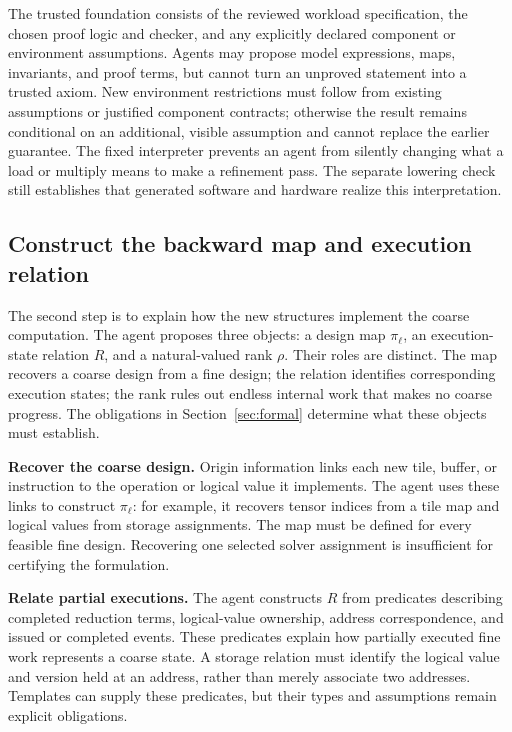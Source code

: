 \documentclass[11pt]{article}
\begin{document}
The trusted foundation consists of the reviewed workload specification, the chosen proof logic and checker, and any explicitly declared component or environment assumptions. Agents may propose model expressions, maps, invariants, and proof terms, but cannot turn an unproved statement into a trusted axiom. New environment restrictions must follow from existing assumptions or justified component contracts; otherwise the result remains conditional on an additional, visible assumption and cannot replace the earlier guarantee. The fixed interpreter prevents an agent from silently changing what a load or multiply means to make a refinement pass. The separate lowering check still establishes that generated software and hardware realize this interpretation.

\subsection{Construct the backward map and execution relation}\label{sec:certificate-construction}
The second step is to explain how the new structures implement the coarse computation. The agent proposes three objects: a design map $\pi_\ell$, an execution-state relation $R$, and a natural-valued rank $\rho$. Their roles are distinct. The map recovers a coarse design from a fine design; the relation identifies corresponding execution states; the rank rules out endless internal work that makes no coarse progress. The obligations in Section~\ref{sec:formal} determine what these objects must establish.

\textbf{Recover the coarse design.} Origin information links each new tile, buffer, or instruction to the operation or logical value it implements. The agent uses these links to construct $\pi_\ell$: for example, it recovers tensor indices from a tile map and logical values from storage assignments. The map must be defined for every feasible fine design. Recovering one selected solver assignment is insufficient for certifying the formulation.

\textbf{Relate partial executions.} The agent constructs $R$ from predicates describing completed reduction terms, logical-value ownership, address correspondence, and issued or completed events. These predicates explain how partially executed fine work represents a coarse state. A storage relation must identify the logical value and version held at an address, rather than merely associate two addresses. Templates can supply these predicates, but their types and assumptions remain explicit obligations.
\end{document}

